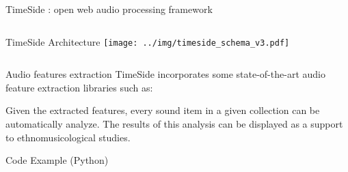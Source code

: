 \documentclass[final, hyperref, table]{beamer}
\begin{document}
\begin{frame}[containsverbatim]{}
\begin{columns}[T]
\begin{column}[T]{.49\linewidth}
\begin{block}{TimeSide : open web audio processing framework}
\begin{columns}[T]
  \begin{column}[T]{0.6\linewidth}
    \begin{beamerboxesrounded}[shadow=true]{TimeSide Architecture}
       \centering
        \texttt{[image: ../img/timeside\_schema\_v3.pdf]}
      \end{beamerboxesrounded}

  \end{column}

\end{columns}

\begin{beamerboxesrounded}%
       [shadow=true]%
       {Audio features extraction}
  TimeSide incorporates some state-of-the-art audio feature extraction
  libraries such as:


  Given the extracted features, every sound item in a given collection
  can be automatically analyze. The results of this analysis can be
  displayed as a support to ethnomusicological studies. 
\end{beamerboxesrounded}






\end{block}

\begin{block}{Code Example (Python)}
\begin{columns}[T]
  \begin{column}[T]{0.6\linewidth}
    
  \end{column}
 

\end{columns}
\end{block}
\end{column}
\end{columns}
\end{frame}
\end{document}
